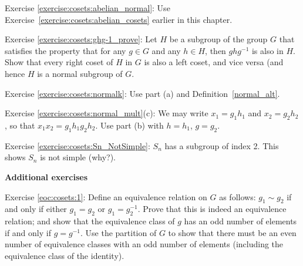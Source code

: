 \noindent Exercise \ref{exercise:cosets:abelian_normal}: Use  Exercise~\ref{exercise:cosets:abelian_cosets} earlier in this chapter.

\noindent Exercise \ref{exercise:cosets:ghg-1_prove}: Let $H$ be a subgroup of the group $G$ that satisfies the property that  for any $g \in G$ and any $h \in H$, then $ghg^{-1}$ is also in $H$. Show that every right coset of $H$ in $G$ is also a left coset, and vice versa (and hence $H$ is a normal subgroup of $G$.

\noindent Exercise \ref{exercise:cosets:normalk}:   Use part (a) and Definition~\ref{normal_alt}.

\noindent Exercise \ref{exercise:cosets:normal_mult}(c):  We may write $x_1 = g_1 h_1$ and $x_2 = g_2 h_2$, so that $x_1 x_2 = g_1 h_1 g_2 h_2$.  Use part (b) with $h=h_1$, $g=g_2$.

\noindent Exercise \ref{exercise:cosets:Sn_NotSimple}:  $S_n$ has a subgroup of index 2.  This shows $S_n$ is not simple  (why?).
\medskip

\textbf{Additional exercises}

\noindent Exercise \ref{eoc:cosets:1}:  Define an equivalence relation on $G$ as follows: $g_1 \sim g_2$ if and only if either $g_1 = g_2$ or $g_1 = g_2^{-1}$. Prove that this is indeed an equivalence relation; and show that the equivalence class of $g$ has an odd number of elements if and only if $g = g^{-1}$. Use the partition of $G$ to show that there must be an even number of  equivalence classes with an odd number of elements (including the equivalence class of the identity).


